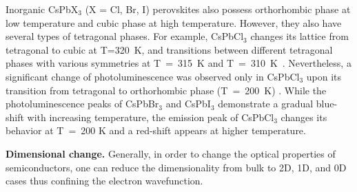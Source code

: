 \documentclass[journal=chreay,manuscript=review]{achemso}
\begin{document}
Inorganic CsPbX$_3$ (X = Cl, Br, I) perovskites also possess orthorhombic phase at low temperature and cubic phase at high temperature. However, they also have several types of tetragonal phases\cite{hirotsu1971experimental, hirotsu1978elastic, tovborg1969nqr}.
For example, CsPbCl$_3$ changes its lattice from tetragonal to cubic at T=320~K, and transitions between different tetragonal phases with various symmetries at T~=~315~K and T~=~310~K~\cite{hiraoka2005observations}. Nevertheless, a significant change of photoluminescence was observed only in CsPbCl$_3$ upon its transition from tetragonal to orthorhombic phase (T~=~200~K) \citep{yi2020correlation}. While the photoluminescence peaks of CsPbBr$_3$ and CsPbI$_3$ demonstrate a gradual blue-shift with increasing temperature, the emission peak of CsPbCl$_3$ changes its behavior at T~=~200 K and a red-shift appears at higher temperature.

% 
\textbf{Dimensional change.}
Generally, in order to change the optical properties of semiconductors, one can reduce the dimensionality from bulk to 2D, 1D, and 0D cases thus confining the electron wavefunction. 
\end{document}
